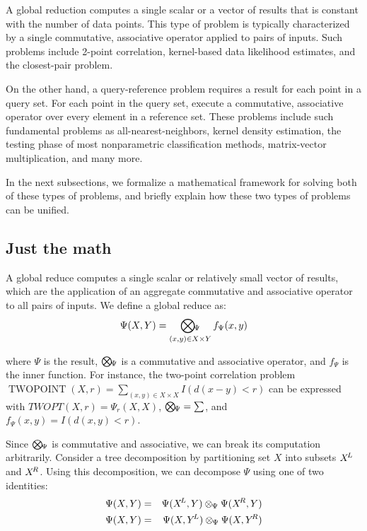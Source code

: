 \documentclass[times, 10pt,twocolumn]{article}
\DeclareMathOperator{\TWOPT}{TWOPOINT}
\newcommand{\kdleft}{\hspace{-0.02in}^L}
\newcommand{\kdright}{\hspace{-0.02in}^R}
\newcommand{\myOp}[1]{\mathop{\bigotimes\nolimits\hspace{-0.045in}_{#1}}}
\newcommand{\myop}[1]{\otimes\hspace{-0.04in}_{#1}\hspace{0.03in}}
\newcommand{\allpsi}{\Psi}
\newcommand{\Oppsi}{\myOp{\Psi}}
\newcommand{\oppsi}{\myop{\Psi}}
\newcommand{\fpsi}{f_{\Psi}}
\begin{document}
A global reduction computes a single scalar or a vector of results that is constant with the number of data points.
This type of problem is typically characterized by a single commutative, associative operator applied to pairs of inputs.
Such problems include 2-point correlation, kernel-based data likelihood estimates, and the closest-pair problem.

On the other hand, a query-reference problem requires a result for each point in a query set.
For each point in the query set, execute a commutative, associative operator over every element in a reference set.
These problems include such fundamental problems as all-nearest-neighbors, kernel density estimation, the testing phase of most nonparametric classification methods, matrix-vector multiplication, and many more.

In the next subsections, we formalize a mathematical framework for solving both of these types of problems, and briefly explain how these two types of problems can be unified.

\subsection{Just the math}


A global reduce computes a single scalar or relatively small vector of results, which are the application of an aggregate commutative and associative operator to all pairs of inputs.
We define a global reduce as:
\begin{equation}
\allpsi(X, Y) = \Oppsi_{(x, y) \in X \times Y} \fpsi(x, y)
\label{eqn:defpsi}
\end{equation}

\noindent where $\allpsi$ is the result, $\Oppsi$ is a commutative and associative operator, and $\fpsi$ is the inner function.
For instance, the two-point correlation problem $\TWOPT(X, r) = \sum_{(x, y) \in X \times X} I(d(x - y) < r)$ can be expressed with $TWOPT(X, r) = \allpsi_r(X, X)$, $\Oppsi = \sum$, and $\fpsi(x, y) = I(d(x, y) < r)$.


Since $\Oppsi$ is commutative and associative, we can break its computation arbitrarily.
Consider a tree decomposition by partitioning set $X$ into subsets $X\kdleft$ and $X\kdright$.
Using this decomposition, we can decompose $\allpsi$ using one of two identities:
\begin{eqnarray}
\allpsi(X, Y) &=& \allpsi(X\kdleft, Y) \oppsi \allpsi(X\kdright, Y)
\\
\allpsi(X, Y) &=& \allpsi(X, Y\kdleft) \oppsi \allpsi(X, Y\kdright)
\label{eqn:dividepsi}
\end{eqnarray}
\end{document}
